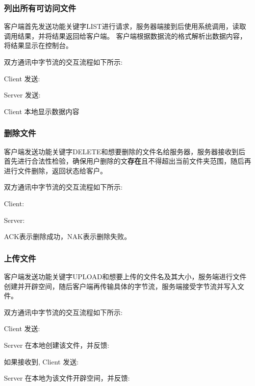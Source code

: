 \documentclass{article}
\begin{document}
\begin{spacing}{2.0}
    \subsubsection{列出所有可访问文件} 客户端首先发送功能关键字LIST进行请求，服务器端接到后使用系统调用，读取调用结果，并将结果返回给客户端。
    客户端根据数据流的格式解析出数据内容，将结果显示在控制台。
    
    双方通讯中字节流的交互流程如下所示:
    
    \indent \indent Client 发送:  

    \indent \indent Server 发送:  

    \indent \indent Client 本地显示数据内容

    \subsubsection{删除文件} 客户端发送功能关键字DELETE和想要删除的文件名给服务器，服务器接收到后首先进行合法性检验，确保用户删除的文\textbf{存在}且不得超出当前文件夹范围，随后再进行文件删除，返回状态给客户。

    双方通讯中字节流的交互流程如下所示:

    \indent \indent Client:  

    \indent \indent Server:  

    ACK表示删除成功，NAK表示删除失败。

    \subsubsection{上传文件} 客户端发送功能关键字UPLOAD和想要上传的文件名及其大小，服务端进行文件创建并开辟空间，随后客户端再传输具体的字节流，服务端接受字节流并写入文件。

    双方通讯中字节流的交互流程如下所示:

    \indent \indent Client 发送: 

    \indent \indent Server 在本地创建该文件，并反馈: 

    \indent \indent 如果接收到, Client 发送: 

    \indent \indent Server 在本地为该文件开辟空间，并反馈: 


\end{spacing}
\end{document}

